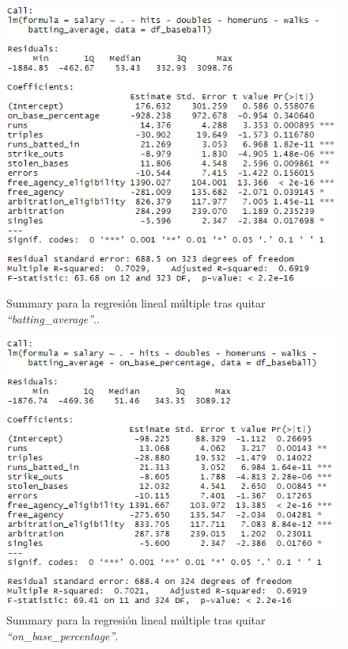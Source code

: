 \documentclass[a4paper,12pt, oneside]{book}
\begin{document}
\begin{figure}[H]
\centering
\includegraphics[scale=0.7]{images/multifit6.PNG}
\caption{Summary para la regresión lineal múltiple tras quitar \textit{``batting\_average''}..}
\end{figure}

\begin{figure}[H]
\centering
\includegraphics[scale=0.7]{images/multifit7.PNG}
\caption{Summary para la regresión lineal múltiple tras quitar \textit{``on\_base\_percentage''}.}
\end{figure}
\end{document}
